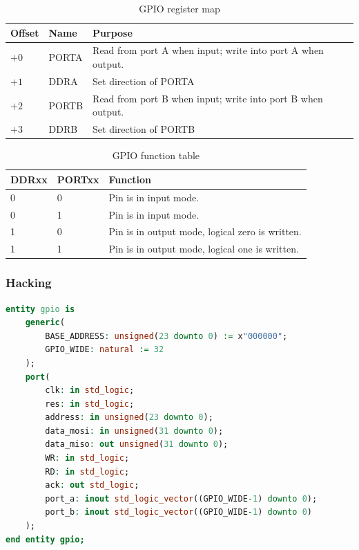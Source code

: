 \begin{table}[]
    \centering
    \begin{tabular}{|l|l|l|}
        \hline
        \textbf{Offset} & \textbf{Name} & \textbf{Purpose}                                            \\ \hline
        $+0$            & PORTA         & Read from port A when input; write into port A when output. \\ \hline
        $+1$            & DDRA          & Set direction of PORTA                                      \\ \hline
        $+2$            & PORTB         & Read from port B when input; write into port B when output. \\ \hline
        $+3$            & DDRB          & Set direction of PORTB                                      \\ \hline
    \end{tabular}
    \caption{GPIO register map}
    \label{tab:gpio_reg_map}
\end{table}

\begin{table}[]
    \centering
    \begin{tabular}{|l|l|l|}
        \hline
        \textbf{DDRxx} & \textbf{PORTxx} & \textbf{Function}                               \\ \hline
        0              & 0               & Pin is in input mode.                           \\ \hline
        0              & 1               & Pin is in input mode.                           \\ \hline
        1              & 0               & Pin is in output mode, logical zero is written. \\ \hline
        1              & 1               & Pin is in output mode, logical one is written.  \\ \hline
    \end{tabular}
    \caption{GPIO function table}
    \label{tab:gpio_fuction}
\end{table}

\subsubsection{Hacking}

\begin{lstlisting}[language=VHDL, frame=single]
entity gpio is
    generic(
        BASE_ADDRESS: unsigned(23 downto 0) := x"000000";
        GPIO_WIDE: natural := 32
    );
    port(
        clk: in std_logic;
        res: in std_logic;
        address: in unsigned(23 downto 0);
        data_mosi: in unsigned(31 downto 0);
        data_miso: out unsigned(31 downto 0);
        WR: in std_logic;
        RD: in std_logic;
        ack: out std_logic;
        port_a: inout std_logic_vector((GPIO_WIDE-1) downto 0);
        port_b: inout std_logic_vector((GPIO_WIDE-1) downto 0)
    );
end entity gpio;
\end{lstlisting}

